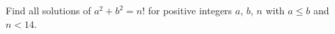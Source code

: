 Find all solutions of $a^2 + b^2 = n!$ for positive integers $a$,  $b$,  $n$ with $a \le b$ and  $n < 14$.